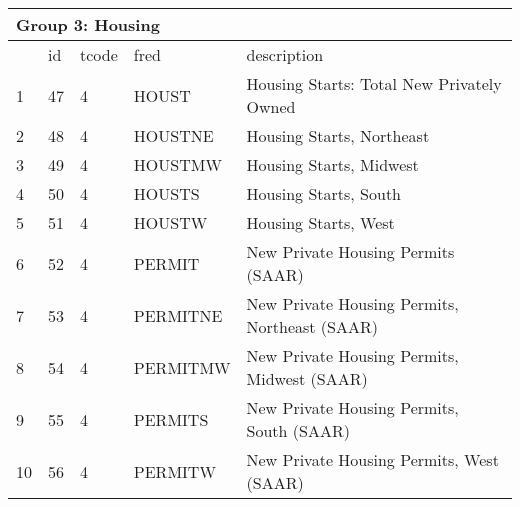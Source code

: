 \begin{table}[ht] 
\centering 
\begin{tabular}{lllll}
\multicolumn{5}{l}{Group 3: Housing} \\
\toprule
 & id & tcode & fred & description \\
\midrule
1 & 47 & 4 & HOUST & Housing Starts: Total New Privately Owned \\
2 & 48 & 4 & HOUSTNE & Housing Starts, Northeast \\
3 & 49 & 4 & HOUSTMW & Housing Starts, Midwest \\
4 & 50 & 4 & HOUSTS & Housing Starts, South \\
5 & 51 & 4 & HOUSTW & Housing Starts, West \\
6 & 52 & 4 & PERMIT & New Private Housing Permits (SAAR) \\
7 & 53 & 4 & PERMITNE & New Private Housing Permits, Northeast (SAAR) \\
8 & 54 & 4 & PERMITMW & New Private Housing Permits, Midwest (SAAR) \\
9 & 55 & 4 & PERMITS & New Private Housing Permits, South (SAAR) \\
10 & 56 & 4 & PERMITW & New Private Housing Permits, West (SAAR) \\
\bottomrule
\end{tabular}  
\end{table} 